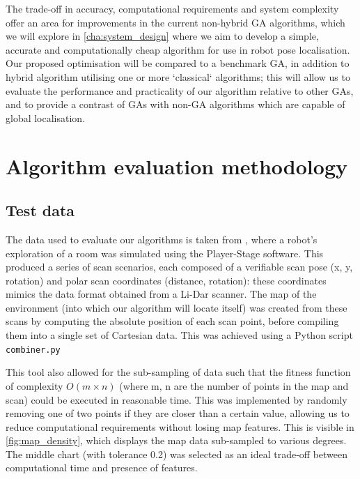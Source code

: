 \documentclass[authoryearcitations]{UoYCSproject}
\begin{document}
The trade-off in accuracy, computational requirements and system complexity offer an area for improvements in the current non-hybrid GA algorithms, which we will explore in \autoref{cha:system_design} where we aim to develop a simple, accurate and computationally cheap algorithm for use in robot pose localisation. Our proposed optimisation will be compared to a benchmark GA, in addition to hybrid algorithm utilising one or more `classical` algorithms; this will allow us to evaluate the performance and practicality of our algorithm relative to other GAs, and to provide a contrast of GAs with non-GA algorithms which are capable of global localisation.


\chapter{Algorithm evaluation methodology}
\label{cha:system_design}

\section{Test data}
The data used to evaluate our algorithms is taken from \citet{Lenac2011-co}, where a robot's exploration of a room was simulated using the Player-Stage software. This produced a series of scan scenarios, each composed of a verifiable scan pose (x, y, rotation) and polar scan coordinates (distance, rotation): these coordinates mimics the data format obtained from a Li-Dar scanner. The map of the environment (into which our algorithm will locate itself) was created from these scans by computing the absolute position of each scan point, before compiling them into a single set of Cartesian data. This was achieved using a Python script \lstinline{combiner.py} \newline


This tool also allowed for the sub-sampling of data such that the fitness function of complexity $O(m\times n)$  (where m, n are the number of points in the map and scan) could be executed in reasonable time. This was implemented by randomly removing one of two points if they are closer than a certain value, allowing us to reduce computational requirements without losing map features. This is visible in \autoref{fig:map_density}, which displays the map data sub-sampled to various degrees. The middle chart (with tolerance 0.2) was selected as an ideal trade-off between computational time and presence of features. \newline
\end{document}
